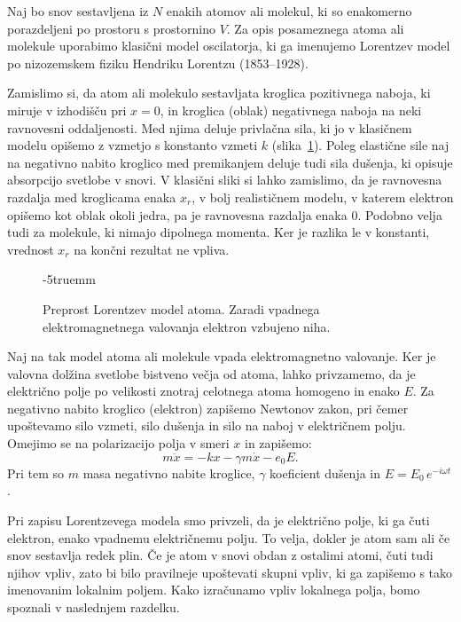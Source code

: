 Naj bo snov sestavljena iz $N$
enakih atomov ali molekul, ki so enakomerno porazdeljeni
po prostoru s prostornino $V$. Za opis posameznega atoma ali molekule uporabimo 
klasični model oscilatorja, ki ga imenujemo Lorentzev model
po nizozemskem fiziku Hendriku Lorentzu (1853--1928).

Zamislimo si, da atom ali molekulo sestavljata kroglica 
pozitivnega naboja, ki miruje v izhodišču pri $x=0$, in kroglica
(oblak) negativnega naboja na neki ravnovesni oddaljenosti. Med njima 
deluje privlačna sila, ki jo v klasičnem modelu opišemo z vzmetjo
s konstanto vzmeti $k$ (slika~\ref{fig:09_Lorentz}). 
Poleg elastične sile naj na negativno nabito kroglico med 
premikanjem deluje tudi sila dušenja, ki opisuje absorpcijo svetlobe
v snovi. V klasični sliki si lahko
zamislimo, da je ravnovesna razdalja med kroglicama enaka $x_r$, 
v bolj realističnem modelu, v katerem elektron opišemo kot oblak okoli jedra,
pa je ravnovesna razdalja enaka 0. Podobno velja tudi za molekule, ki 
nimajo dipolnega momenta. Ker je razlika le v konstanti, vrednost $x_r$
na končni rezultat ne vpliva.
\begin{figure}[ht]
\centering
\def\svgwidth{60truemm} 

\caption{Preprost Lorentzev model atoma. Zaradi vpadnega 
elektromagnetnega valovanja elektron vzbujeno niha.
}
\label{fig:09_Lorentz}
\vglue-5truemm
\end{figure}

Naj na tak model atoma ali molekule vpada elektromagnetno valovanje. Ker je 
valovna dolžina svetlobe bistveno večja od atoma, lahko privzamemo, da
je električno polje po velikosti znotraj celotnega atoma homogeno in enako $E$.
Za negativno nabito kroglico (elektron) zapišemo Newtonov zakon, pri čemer 
upoštevamo silo vzmeti, silo 
dušenja in silo na naboj v električnem polju. Omejimo se na polarizacijo 
polja v smeri $x$ in zapišemo:
\begin{equation}
m \ddot{x} = -kx -\gamma m \dot{x} - e_0 E.
\label{eq:09_02}
\end{equation}
Pri tem so $m$ masa negativno nabite kroglice, $\gamma$ koeficient dušenja
in $E = E_0\,e^{-i\omega t}$.

\begin{remark}
Pri zapisu Lorentzevega modela smo privzeli, da je električno polje, 
ki ga čuti elektron, enako vpadnemu električnemu polju. 
To velja, dokler je atom sam ali če snov sestavlja redek plin. Če je 
atom v snovi obdan z ostalimi atomi, 
čuti tudi njihov vpliv, zato bi bilo pravilneje upoštevati skupni vpliv, ki 
ga zapišemo s tako imenovanim lokalnim poljem. 
Kako izračunamo vpliv lokalnega polja, bomo spoznali v naslednjem razdelku.
\end{remark}

